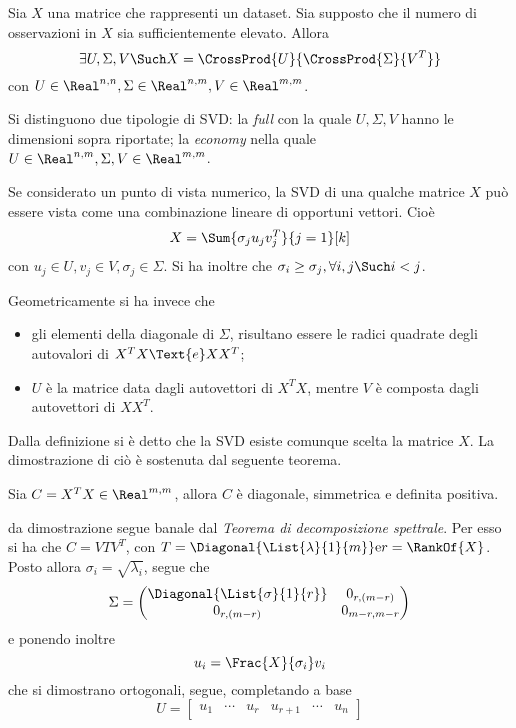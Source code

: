\documentclass{subfiles}
\begin{document}
Sia \(X\) una matrice che rappresenti un dataset. Sia supposto che il numero di osservazioni in \(X\) sia sufficientemente elevato.
Allora
\[
    \exists U, \Sigma, V \Such X = \CrossProd{U}{\CrossProd{\Sigma}{V^{T}}}
\]
con \(U \in \Real^{n,n}, \Sigma \in \Real^{n, m}, V \in \Real^{m, m}\).
\begin{Remark*}
    Si distinguono due tipologie di SVD: la \emph{full} con la quale \(U, \Sigma, V\) hanno le dimensioni sopra riportate;
    la \emph{economy} nella quale \(U \in \Real^{n, m}, \Sigma, V \in \Real^{m ,m}\).
\end{Remark*}

Se considerato un punto di vista numerico, la SVD di una qualche matrice \(X\) può essere vista come una combinazione lineare di opportuni vettori.
Cioè
\[
    X = \Sum{\sigma_{j}u_{j}v_{j}^{T}}{j = 1}[k]
\]
con \(u_{j} \in U, v_{j} \in V, \sigma_{j} \in \Sigma\). Si ha inoltre che \(\sigma_{i} \ge \sigma_{j}, \forall i, j \Such i < j\).

Geometricamente si ha invece che
\begin{itemize}
    \item gli elementi della diagonale di \(\Sigma\), risultano essere le radici quadrate degli autovalori di \(X^{T} X \Text{e} X X^{T}\);
    \item \(U\) è la matrice data dagli autovettori di \(X^{T} X\), mentre \(V\) è composta dagli autovettori di \(X X^{T}\).
\end{itemize}

Dalla definizione si è detto che la SVD esiste comunque scelta la matrice \(X\). La dimostrazione di ciò è sostenuta dal seguente teorema.
\begin{Theorem*}
    Sia \(C = X^{T}X \in \Real^{m,m}\), allora \(C\) è diagonale, simmetrica e definita positiva.
    \begin{Proof*}
        da dimostrazione segue banale dal \emph{Teorema di decomposizione spettrale}.
        Per esso si ha che \(C = V T V^{T}\), con \(T = \Diagonal{\List{\lambda}{1}{m}} \text{e} r = \RankOf{X}\).
        Posto allora \(\sigma_{i} = \sqrt{\lambda_{i}}\), segue che
        \[\Sigma = \begin{pmatrix}
                \Diagonal{\List{\sigma}{1}{r}} & 0_{r, (m - r)}   \\
                0_{r, (m - r)}                 & 0_{m - r, m - r} \\
            \end{pmatrix}\]
        e ponendo inoltre
        \[
            u_{i} = \Frac{X}{\sigma_{i}}v_{i}
        \]
        che si dimostrano ortogonali, segue, completando a base
        \[U = \begin{bmatrix}
                u_{1} & \cdots & u_{r} & u_{r + 1} & \cdots & u_{n}
            \end{bmatrix}\]
    \end{Proof*}
\end{Theorem*}
\clearpage
\end{document}
